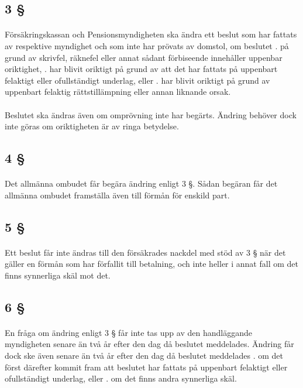 \documentclass[a4paper,notitlepage,openany,10pt]{book}
\begin{document}
\subsection*{3 §}
\paragraph*{}
Försäkringskassan och Pensionsmyndigheten ska ändra ett beslut som har fattats av respektive myndighet och som inte har prövats av domstol, om beslutet
. på grund av skrivfel, räknefel eller annat sådant förbiseende innehåller uppenbar oriktighet,
. har blivit oriktigt på grund av att det har fattats på uppenbart felaktigt eller ofullständigt underlag, eller
. har blivit oriktigt på grund av uppenbart felaktig rättstillämpning eller annan liknande orsak.
\paragraph*{}
Beslutet ska ändras även om omprövning inte har begärts.
Ändring behöver dock inte göras om oriktigheten är av ringa betydelse.
\subsection*{4 §}
\paragraph*{}
Det allmänna ombudet får begära ändring enligt 3 §. Sådan begäran får det allmänna ombudet framställa även till förmån för enskild part.
\subsection*{5 §}
\paragraph*{}
Ett beslut får inte ändras till den försäkrades nackdel med stöd av 3 § när det gäller en förmån som har förfallit till betalning, och inte heller i annat fall om det finns synnerliga skäl mot det.
\subsection*{6 §}
\paragraph*{}
En fråga om ändring enligt 3 § får inte tas upp av den handläggande myndigheten senare än två år efter den dag då beslutet meddelades. Ändring får dock ske även senare än två år efter den dag då beslutet meddelades
. om det först därefter kommit fram att beslutet har fattats på uppenbart felaktigt eller ofullständigt underlag, eller
. om det finns andra synnerliga skäl.
\end{document}
